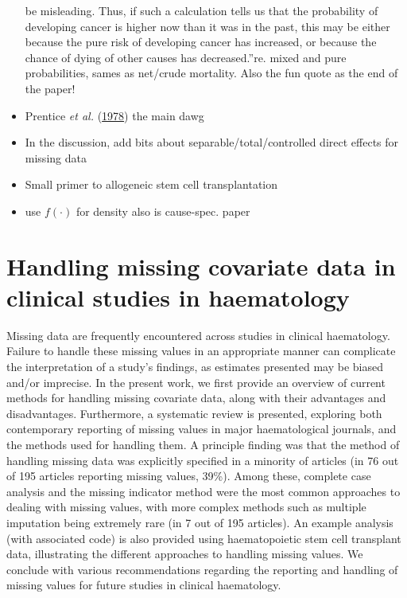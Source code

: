 \documentclass[
  letterpaper,
  DIV=11,
  numbers=noendperiod]{scrreprt}
\begin{document}
\begin{itemize}
  be misleading. Thus, if such a calculation tells us that the
  probability of developing cancer is higher now than it was in the
  past, this may be either because the pure risk of developing cancer
  has increased, or because the chance of dying of other causes has
  decreased.''re. mixed and pure probabilities, sames as net/crude
  mortality. Also the fun quote as the end of the paper!
\item
  Prentice \emph{et al.}
  (\protect\hyperlink{ref-prenticeAnalysisFailureTimes1978}{1978}) the
  main dawg
\item
  In the discussion, add bits about separable/total/controlled direct
  effects for missing data
\item
  Small primer to allogeneic stem cell transplantation
\item
  use \(f(\cdot)\) for density also is cause-spec. paper
\end{itemize}


\hypertarget{handling-missing-covariate-data-in-clinical-studies-in-haematology}{%
\chapter{Handling missing covariate data in clinical studies in
haematology}\label{handling-missing-covariate-data-in-clinical-studies-in-haematology}}

Missing data are frequently encountered across studies in clinical
haematology. Failure to handle these missing values in an appropriate
manner can complicate the interpretation of a study's findings, as
estimates presented may be biased and/or imprecise. In the present work,
we first provide an overview of current methods for handling missing
covariate data, along with their advantages and disadvantages.
Furthermore, a systematic review is presented, exploring both
contemporary reporting of missing values in major haematological
journals, and the methods used for handling them. A principle finding
was that the method of handling missing data was explicitly specified in
a minority of articles (in 76 out of 195 articles reporting missing
values, 39\%). Among these, complete case analysis and the missing
indicator method were the most common approaches to dealing with missing
values, with more complex methods such as multiple imputation being
extremely rare (in 7 out of 195 articles). An example analysis (with
associated code) is also provided using haematopoietic stem cell
transplant data, illustrating the different approaches to handling
missing values. We conclude with various recommendations regarding the
reporting and handling of missing values for future studies in clinical
haematology.
\end{document}
